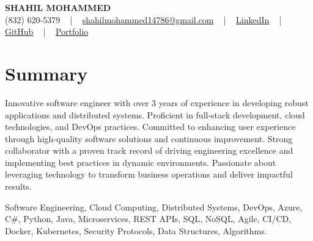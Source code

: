 \documentclass[letterpaper,10pt]{article}
\begin{document}
\begin{center}
    {\fontsize{14pt}{12pt}\selectfont \textbf{\MakeUppercase{Shahil Mohammed}}}\\ \vspace{2pt}
    \fontsize{10pt}{12pt}\selectfont (832) 620-5379 ~ | ~ \href{mailto:shahilmohammed14786@gmail.com}{shahilmohammed14786@gmail.com} ~ | ~  
    \href{https://www.linkedin.com/in/shahil-mohammed-9652931a1/}{\color{blue}\underline{LinkedIn}}  ~ | ~ 
    \href{https://github.com/freakbeast14}{\color{blue}\underline{GitHub}} ~ | ~ 
    \href{https://shahil-mohammed.netlify.app/}{\color{blue}\underline{Portfolio}}
    \vspace{-8pt}
\end{center}

\section{Summary}
\vspace{-2pt}\fontsize{8pt}{9pt}\selectfont
Innovative software engineer with over 3 years of experience in developing robust applications and distributed systems. Proficient in full-stack development, cloud technologies, and DevOps practices. Committed to enhancing user experience through high-quality software solutions and continuous improvement. Strong collaborator with a proven track record of driving engineering excellence and implementing best practices in dynamic environments. Passionate about leveraging technology to transform business operations and deliver impactful results.
 \vspace{-5pt}
 
{\fontsize{1pt}{1pt}\selectfont\color{white}
Software Engineering, Cloud Computing, Distributed Systems, DevOps, Azure, C#, Python, Java, Microservices, REST APIs, SQL, NoSQL, Agile, CI/CD, Docker, Kubernetes, Security Protocols, Data Structures, Algorithms.
}
\vspace{-8pt}

\vspace{-2pt}
\end{document}
